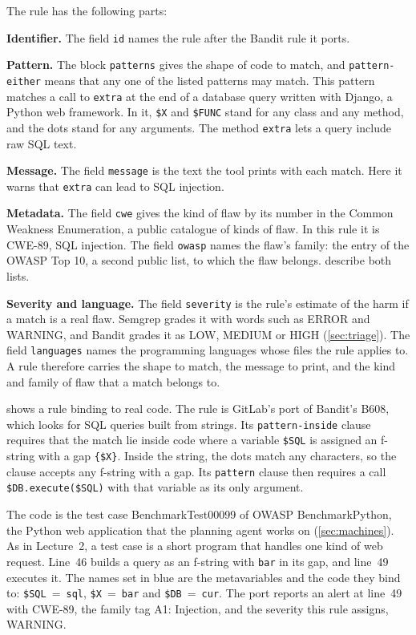 The rule has the following parts:
\bi
\item \textbf{Identifier.} The field \texttt{id} names the rule after the Bandit rule it ports.
\item \textbf{Pattern.} The block \texttt{patterns} gives the shape of code to match, and
\texttt{pattern-either} means that any one of the listed patterns may match. This pattern matches a
call to \texttt{extra} at the end of a database query written with Django, a Python web framework.
In it, \texttt{\$X} and \texttt{\$FUNC} stand for any class and any method, and the dots stand for
any arguments. The method \texttt{extra} lets a query include raw SQL text.
\item \textbf{Message.} The field \texttt{message} is the text the tool prints with each match. Here
it warns that \texttt{extra} can lead to SQL injection.
\item \textbf{Metadata.} The field \texttt{cwe} gives the kind of flaw by its number in the Common
Weakness Enumeration, a public catalogue of kinds of flaw. In this rule it is CWE-89, SQL
injection. The field \texttt{owasp} names the flaw's family: the entry of the OWASP Top 10, a second
public list, to which the flaw belongs.  describe both
lists.
\item \textbf{Severity and language.} The field \texttt{severity} is the rule's estimate of the harm
if a match is a real flaw. Semgrep grades it with words such as ERROR and WARNING, and Bandit grades
it as LOW, MEDIUM or HIGH (\cref{sec:triage}). The field \texttt{languages} names the programming
languages whose files the rule applies to.
\ei
A rule therefore carries the shape to match, the message to print, and the kind and family of flaw
that a match belongs to.

 shows a rule binding to real code. The rule is GitLab's port of
Bandit's B608, which looks for SQL queries built from strings. Its \texttt{pattern-inside} clause
requires that the match lie inside code where a variable \texttt{\$SQL} is assigned an f-string with
a gap \texttt{\{\$X\}}. Inside the string, the dots match any characters, so the clause accepts any
f-string with a gap. Its \texttt{pattern} clause then requires a call \texttt{\$DB.execute(\$SQL)}
with that variable as its only argument.

The code is the test case BenchmarkTest00099 of OWASP BenchmarkPython, the Python web application
that the planning agent works on (\cref{sec:machines}). As in Lecture~2, a test case is a short program
that handles one kind of web request. Line~46 builds a query as an f-string with \texttt{bar} in
its gap, and line~49 executes it. The names set in blue are the metavariables and the code they
bind to: \texttt{\$SQL}~=~\texttt{sql}, \texttt{\$X}~=~\texttt{bar} and \texttt{\$DB}~=~\texttt{cur}.
The port reports an alert at line~49 with CWE-89, the family tag A1: Injection, and the severity
this rule assigns, WARNING.

